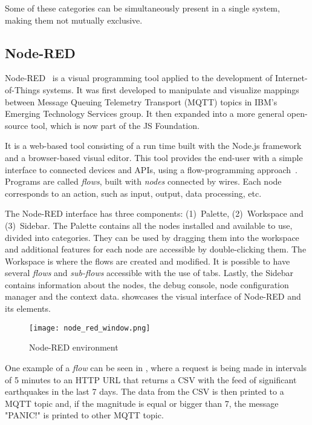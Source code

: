 Some of these categories can be simultaneously present in a single system, making them not mutually exclusive.

\subsection{Node-RED}\label{sec:node-red}

Node-RED~\cite{node_red} is a visual programming tool applied to the development of Internet-of-Things systems. It was first developed to manipulate and visualize mappings between Message Queuing Telemetry Transport (MQTT) topics in IBM's Emerging Technology Services group. It then expanded into a more general open-source tool, which is now part of the JS Foundation.

It is a web-based tool consisting of a run time built with the Node.js framework and a browser-based visual editor. This tool provides the end-user with a simple interface to connected devices and APIs, using a flow-programming approach~\cite{node_red}. Programs are called \emph{flows}, built with \emph{nodes} connected by wires. Each node corresponds to an action, such as input, output, data processing, etc.

The Node-RED interface has three components: (1)~Palette, (2)~Workspace and (3)~Sidebar. The Palette contains all the nodes installed and available to use, divided into categories. They can be used by dragging them into the workspace and additional features for each node are accessible by double-clicking them. The Workspace is where the flows are created and modified. It is possible to have several \emph{flows} and \emph{sub-flows} accessible with the use of tabs. Lastly, the Sidebar contains information about the nodes, the debug console, node configuration manager and the context data.  showcases the visual interface of Node-RED and its elements.

\begin{figure}[h]
\centering
\texttt{[image: node\_red\_window.png]}
\caption{Node-RED environment}
\label{fig:node_red_window}
\end{figure}

One example of a \emph{flow} can be seen in , where a request is being made in intervals of 5 minutes to an HTTP URL that returns a CSV with the feed of significant earthquakes in the last 7 days. The data from the CSV is then printed to a MQTT topic and, if the magnitude is equal or bigger than 7, the message "PANIC!" is printed to other MQTT topic. 

